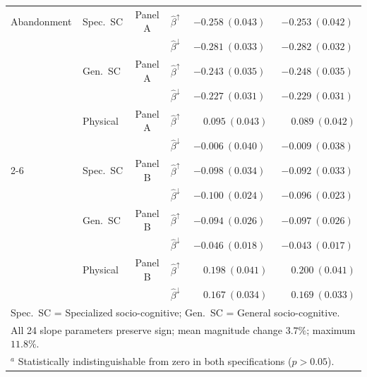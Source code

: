 \begin{table}[H]
\begin{tabular}{llclcc}
Abandonment & Spec.\ SC & Panel A
   & $\hat{\beta}^{\uparrow}$
   & $-0.258\ (0.043)$ & $-0.253\ (0.042)$ \\[2pt]
 & & & $\hat{\beta}^{\downarrow}$
   & $-0.281\ (0.033)$ & $-0.282\ (0.032)$ \\[4pt]
 & Gen.\ SC & Panel A
   & $\hat{\beta}^{\uparrow}$
   & $-0.243\ (0.035)$ & $-0.248\ (0.035)$ \\[2pt]
 & & & $\hat{\beta}^{\downarrow}$
   & $-0.227\ (0.031)$ & $-0.229\ (0.031)$ \\[4pt]
 & Physical & Panel A
   & $\hat{\beta}^{\uparrow}$
   & $\phantom{-}0.095\ (0.043)$ & $\phantom{-}0.089\ (0.042)$ \\[2pt]
 & & & $\hat{\beta}^{\downarrow}$
   & $-0.006\ (0.040)$ & $-0.009\ (0.038)$ \\
\cmidrule(lr){2-6}
  & Spec.\ SC & Panel B
   & $\hat{\beta}^{\uparrow}$
   & $-0.098\ (0.034)$ & $-0.092\ (0.033)$ \\[2pt]
 & & & $\hat{\beta}^{\downarrow}$
   & $-0.100\ (0.024)$ & $-0.096\ (0.023)$ \\[4pt]
 & Gen.\ SC & Panel B
   & $\hat{\beta}^{\uparrow}$
   & $-0.094\ (0.026)$ & $-0.097\ (0.026)$ \\[2pt]
 & & & $\hat{\beta}^{\downarrow}$
   & $-0.046\ (0.018)$ & $-0.043\ (0.017)$ \\[4pt]
 & Physical & Panel B
   & $\hat{\beta}^{\uparrow}$
   & $\phantom{-}0.198\ (0.041)$ & $\phantom{-}0.200\ (0.041)$ \\[2pt]
 & & & $\hat{\beta}^{\downarrow}$
   & $\phantom{-}0.167\ (0.034)$ & $\phantom{-}0.169\ (0.033)$ \\
\bottomrule
\multicolumn{6}{l}{\footnotesize Spec.~SC = Specialized socio-cognitive; Gen.~SC = General socio-cognitive.} \\
\multicolumn{6}{l}{\footnotesize All 24 slope parameters preserve sign; mean magnitude change $3.7\%$; maximum $11.8\%$.} \\
\multicolumn{6}{l}{\footnotesize $^{a}$ Statistically indistinguishable from zero in both specifications ($p>0.05$).} \\
\end{tabular}
\end{table}
